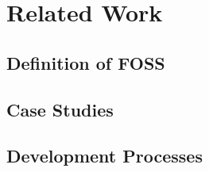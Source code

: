\chapter{Related Work} %
\label{cha:Related Work}

\section{Definition of FOSS} %
\label{sec:Definition of FOSS}


\section{Case Studies} %
\label{sec:Case Studies}


\section{Development Processes} %
\label{sec:Development Processes}


